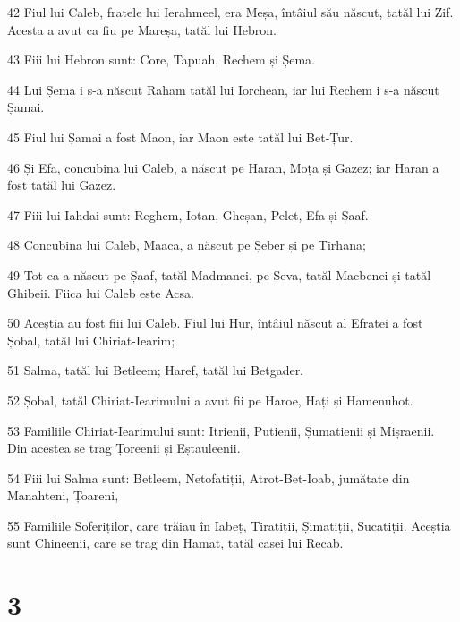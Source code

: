 \par 42 Fiul lui Caleb, fratele lui Ierahmeel, era Meșa, întâiul său născut, tatăl lui Zif. Acesta a avut ca fiu pe Mareșa, tatăl lui Hebron.
\par 43 Fiii lui Hebron sunt: Core, Tapuah, Rechem și Șema.
\par 44 Lui Șema i s-a născut Raham tatăl lui Iorchean, iar lui Rechem i s-a născut Șamai.
\par 45 Fiul lui Șamai a fost Maon, iar Maon este tatăl lui Bet-Țur.
\par 46 Și Efa, concubina lui Caleb, a născut pe Haran, Moța și Gazez; iar Haran a fost tatăl lui Gazez.
\par 47 Fiii lui Iahdai sunt: Reghem, Iotan, Gheșan, Pelet, Efa și Șaaf.
\par 48 Concubina lui Caleb, Maaca, a născut pe Șeber și pe Tirhana;
\par 49 Tot ea a născut pe Șaaf, tatăl Madmanei, pe Șeva, tatăl Macbenei și tatăl Ghibeii. Fiica lui Caleb este Acsa.
\par 50 Aceștia au fost fiii lui Caleb. Fiul lui Hur, întâiul născut al Efratei a fost Șobal, tatăl lui Chiriat-Iearim;
\par 51 Salma, tatăl lui Betleem; Haref, tatăl lui Betgader.
\par 52 Șobal, tatăl Chiriat-Iearimului a avut fii pe Haroe, Hați și Hamenuhot.
\par 53 Familiile Chiriat-Iearimului sunt: Itrienii, Putienii, Șumatienii și Mișraenii. Din acestea se trag Țoreenii și Eștauleenii.
\par 54 Fiii lui Salma sunt: Betleem, Netofatiții, Atrot-Bet-Ioab, jumătate din Manahteni, Țoareni,
\par 55 Familiile Soferiților, care trăiau în Iabeț, Tiratiții, Șimatiții, Sucatiții. Aceștia sunt Chineenii, care se trag din Hamat, tatăl casei lui Recab.

\chapter{3}

